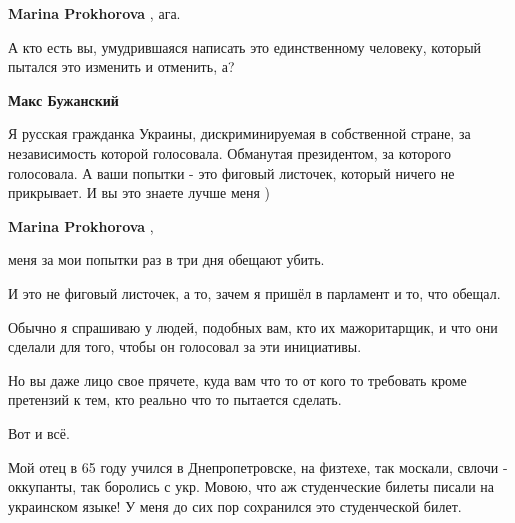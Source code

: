\begin{itemize}
\begin{itemize}
\textbf{Marina Prokhorova} , ага.

А кто есть вы, умудрившаяся написать это единственному человеку, который пытался это изменить и отменить, а?

 
\textbf{Макс Бужанский} 

Я русская гражданка Украины, дискриминируемая в собственной стране, за
независимость которой голосовала. Обманутая президентом, за которого
голосовала. А ваши попытки - это фиговый листочек, который ничего не
прикрывает. И вы это знаете лучше меня )


 
\textbf{Marina Prokhorova} , 

меня за мои попытки раз в три дня обещают убить.

И это не фиговый листочек, а то, зачем я пришёл в парламент и то, что обещал.

Обычно я спрашиваю у людей, подобных вам, кто их мажоритарщик, и что они
сделали для того, чтобы он голосовал за эти инициативы.

Но вы даже лицо свое прячете, куда вам что то от кого то требовать кроме
претензий к тем, кто реально что то пытается сделать.

Вот и всё.
\end{itemize}

 

Мой отец в 65 году учился в Днепропетровске, на физтехе, так москали, свлочи -
оккупанты, так боролись с укр. Мовою, что аж студенческие билеты писали на
украинском языке! У меня до сих пор сохранился это студенческой билет.

\begin{itemize}
 

\end{itemize}
\end{itemize}
